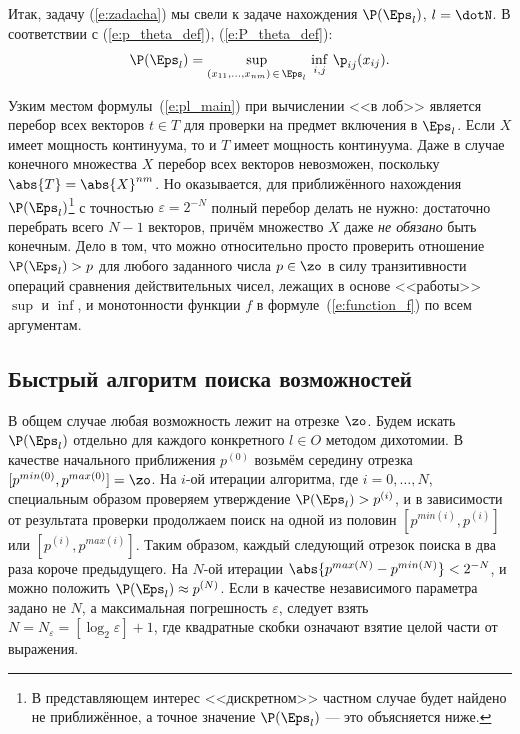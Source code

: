  Итак, задачу (\ref{e:zadacha}) мы свели к задаче нахождения $\P(\Eps_l)$, $l = \dotN$. В соответствии с (\ref{e:p_theta_def}), (\ref{e:P_theta_def}):
\begin{equation}
  \label{e:pl_main}
  \P(\Eps_l) = \sup_{(x_{11}, ..., x_{nm})\,\in\,\Eps_l} \, \inf_{i, j}\,\p_{ij}(x_{ij}). 
\end{equation}

Узким местом формулы~(\ref{e:pl_main}) при вычислении <<в лоб>> является перебор всех векторов $t \in T$ для проверки на предмет включения в $\Eps_l$. Если $X$ имеет мощность континуума, то и $T$ имеет мощность континуума. Даже в случае конечного множества $X$ перебор всех векторов невозможен, поскольку $\abs{T} = \abs{X}^{nm}$. Но оказывается, для приближённого нахождения $\P(\Eps_l)$\footnote{В представляющем интерес <<дискретном>> частном случае будет найдено не приближённое, а точное значение $\P(\Eps_l)$ --- это объясняется ниже.} с точностью $\varepsilon = 2^{-N}$ полный перебор делать не нужно: достаточно перебрать всего $N-1$ векторов, причём множество $X$ даже {\sl не обязано} быть конечным. Дело в том, что можно относительно просто проверить отношение $\P(\Eps_l) > p$ для любого заданного числа $p \in \zo$ в силу транзитивности операций сравнения действительных чисел, лежащих в основе <<работы>>  $\sup$ и $\inf$, и монотонности функции $f$ в формуле~(\ref{e:function_f}) по всем аргументам. 

\subsection{Быстрый алгоритм поиска возможностей}

В общем случае любая возможность лежит на отрезке $\zo$. Будем искать $\P(\Eps_l)$ отдельно для каждого конкретного $l \in O$ методом дихотомии. В качестве начального приближения $p^{(0)}$ возьмём середину отрезка $[p^{min(0)}, p^{max(0)}] = \zo$. На $i$-ой итерации алгоритма, где $i = 0, \ldots, N$, специальным образом проверяем утверждение $\P(\Eps_l) > p^{(i)}$, и в зависимости от результата проверки продолжаем поиск на одной из половин $[p^{min(i)}, p^{(i)}]$ или $[p^{(i)}, p^{max(i)}]$. Таким образом, каждый следующий отрезок поиска в два раза короче предыдущего.  На $N$-ой итерации $\abs{p^{max(N)} - p^{min(N)}} < 2^{-N}$, и можно положить $\P(\Eps_l) \approx p^{(N)}$. Если в качестве независимого параметра задано не $N$, а максимальная погрешность  $\varepsilon$, следует взять $N = N_{\varepsilon} = [\log_2{\varepsilon}]+1$,  где квадратные скобки означают взятие целой части от выражения. 

